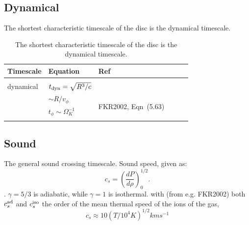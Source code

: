 \documentclass[11pt]{article}
\begin{document}
\subsection{Dynamical}
The shortest characteristic timescale of the disc is the dynamical timescale. 

\begin{table}
  \begin{center}
    \begin{tabular}{l l l l l l} 
      \hline
      \hline 
      Timescale   & Equation    &  Ref  \\
      \hline  
       &&& \\
       dynamical  & $t_{\rm dyn} = \sqrt{R^{3}/c}$ &     \\
                          &  $\sim R/v_{\phi}$           &  \multirow{3}{*}{FKR2002, Eqn~(5.63) }  \\
                          & $t_{\phi} \sim \Omega_{K}^{-1}$                                             &  \\
        &&& \\
         \hline
         \hline 
       \end{tabular}
      \caption{The shortest characteristic timescale of the disc is the dynamical timescale.}
      \label{tab:lightcrossing}
    \end{center}
\end{table}


\subsection{Sound}
The general sound crossing timescale. 
Sound speed, given as:
\begin{equation}
     c_{s} =  \left (\frac{d P}{d \rho} \right)^{1/2}_{0}.
\end{equation}. 
$\gamma = 5/3$ is adiabatic, while $\gamma = 1$ is isothermal.
with (from e.g. FKR2002) both $c_{s}^{\rm ad}$ and $c_{s}^{\rm iso}$
the order of the mean thermal speed of the ions of the gas,
\begin{equation}
c_{s} \approx 10 (T/10^{4} K)^{1/2} km s^{-1}
\end{equation}
\end{document}
